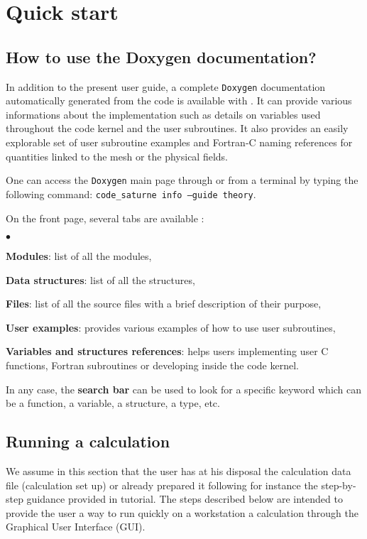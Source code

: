 \section{Quick start}

\subsection{How to use the Doxygen documentation?}

In addition to the present user guide, a complete
\texttt{Doxygen} documentation automatically generated from the code is available with \CS. It can provide various informations about the implementation such as details on variables used throughout the code kernel and the user subroutines. It also provides an easily explorable set of user subroutine examples and Fortran-C naming references for quantities linked to the mesh or the physical fields.

One can access the \texttt{Doxygen} main page through  or from a terminal by typing the following command:
\texttt{code\_saturne info --guide theory}.

On the front page, several tabs are available :
\begin{list}{$\bullet$}{}
\item \textbf{Modules}: list of all the \CS modules,
\item \textbf{Data structures}: list of all the \CS structures,
\item \textbf{Files}: list of all the source files with a brief description of their purpose,
\item \textbf{User examples}: provides various examples of how to use user subroutines,
\item \textbf{Variables and structures references}: helps users implementing user C functions,
Fortran subroutines or developing inside the code kernel.
\end{list}

In any case, the \textbf{search bar} can be used to look for a specific keyword which can
be a function, a variable, a structure, a type, etc.

\subsection{Running a calculation}
We assume in this section that the user has at his disposal the calculation data file (calculation set up) or already prepared it following for instance the step-by-step guidance provided in \CS tutorial. The steps described below are intended to provide the user a way to run quickly on a workstation a calculation through the Graphical User Interface (GUI).

